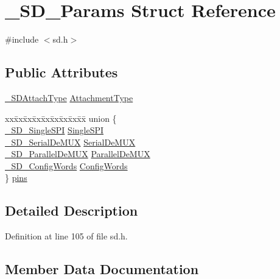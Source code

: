 \hypertarget{struct__SD__Params}{}\section{\+\_\+\+S\+D\+\_\+\+Params Struct Reference}
\label{struct__SD__Params}


{\ttfamily \#include $<$sd.\+h$>$}

\subsection*{Public Attributes}
\begin{DoxyCompactItemize}
\item 
\mbox{\hyperlink{sd_8h_ab581f52e9a0c0b3237ed39225109fd90}{\+\_\+\+S\+D\+Attach\+Type}} \mbox{\hyperlink{struct__SD__Params_ae9fb2e30b67ee7793f85c43c4a418ab7}{Attachment\+Type}}
\item 
\begin{tabbing}
xx\=xx\=xx\=xx\=xx\=xx\=xx\=xx\=xx\=\kill
union \{\\
\>\mbox{\hyperlink{struct__SD__SingleSPI}{\_SD\_SingleSPI}} \mbox{\hyperlink{struct__SD__Params_ae880e39a0b7f582e73d56e9cece8968f}{SingleSPI}}\\
\>\mbox{\hyperlink{struct__SD__SerialDeMUX}{\_SD\_SerialDeMUX}} \mbox{\hyperlink{struct__SD__Params_aaed065c1970e2b13c97f02c6948f7e16}{SerialDeMUX}}\\
\>\mbox{\hyperlink{struct__SD__ParallelDeMUX}{\_SD\_ParallelDeMUX}} \mbox{\hyperlink{struct__SD__Params_aef6ef6adeec34d97a1b90bd39606f3b2}{ParallelDeMUX}}\\
\>\mbox{\hyperlink{struct__SD__ConfigWords}{\_SD\_ConfigWords}} \mbox{\hyperlink{struct__SD__Params_afe8434a321362587a1f7c231b66ed51b}{ConfigWords}}\\
\} \mbox{\hyperlink{struct__SD__Params_aab37277649a69277194250f502e6fbb3}{pins}}\\

\end{tabbing}\end{DoxyCompactItemize}


\subsection{Detailed Description}


Definition at line 105 of file sd.\+h.



\subsection{Member Data Documentation}
\mbox{\label{struct__SD__Params_ae9fb2e30b67ee7793f85c43c4a418ab7}} 
